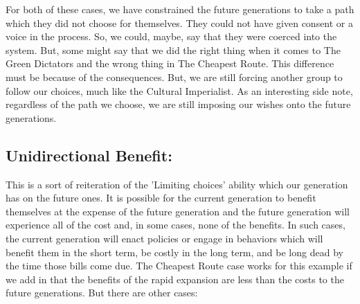 

For both of these cases, we have constrained the future generations to take a path which they did not choose for themselves. They could not have given consent or a voice in the process. So, we could, maybe, say that they were coerced into the system. But, some might say that we did the right thing when it comes to The Green Dictators and the wrong thing in The Cheapest Route. This difference must be because of the consequences. But, we are still forcing another group to follow our choices, much like the Cultural Imperialist. As an interesting side note, regardless of the path we choose, we are still imposing our wishes onto the future generations.
\subsection{Unidirectional Benefit:}

This is a sort of reiteration of the 'Limiting choices' ability which our generation has on the future ones. It is possible for the current generation to benefit themselves at the expense of the future generation and the future generation will experience all of the cost and, in some cases, none of the benefits. In such cases, the current generation will enact policies or engage in behaviors which will benefit them in the short term, be costly in the long term, and be long dead by the time those bills come due.  The Cheapest Route case works for this example if we add in that the benefits of the rapid expansion are less than the costs to the future generations. But there are other cases:

